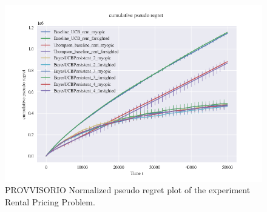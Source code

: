 \begin{figure}[H]
	\centering
	\includegraphics[width=16cm]{./images/provvisori/RENT_provvisorio.png}
		
	\caption{PROVVISORIO Normalized pseudo regret plot of the experiment Rental Pricing Problem.}
\end{figure}


